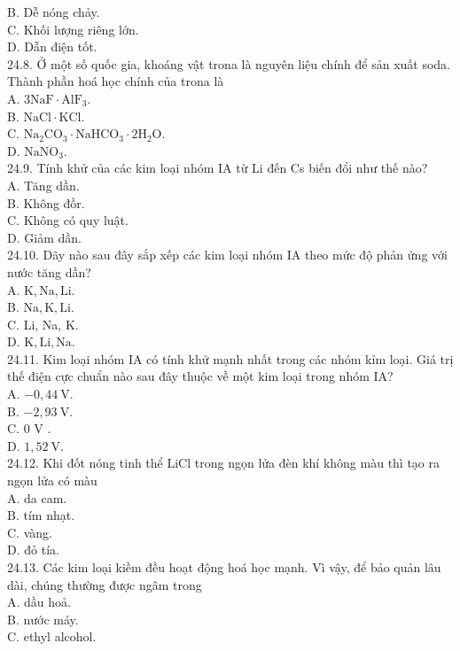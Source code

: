 \documentclass[10pt]{article}
\begin{document}
B. Dễ nóng chảy.\\
C. Khối lượng riêng lớn.\\
D. Dẫn điện tốt.\\
24.8. Ở một số quốc gia, khoáng vật trona là nguyên liệu chính để sản xuất soda. Thành phần hoá học chính của trona là\\
A. $3 \mathrm{NaF} \cdot \mathrm{AlF}_{3}$.\\
B. $\mathrm{NaCl} \cdot \mathrm{KCl}$.\\
C. $\mathrm{Na}_{2} \mathrm{CO}_{3} \cdot \mathrm{NaHCO}_{3} \cdot 2 \mathrm{H}_{2} \mathrm{O}$.\\
D. $\mathrm{NaNO}_{3}$.\\
24.9. Tính khử của các kim loại nhóm IA từ Li đến Cs biến đổi như thế nào?\\
A. Tăng dần.\\
B. Không đồr.\\
C. Không có quy luật.\\
D. Giảm dần.\\
24.10. Dãy nào sau đây sắp xếp các kim loại nhóm IA theo mức độ phản ứng với nước tăng dần?\\
A. $\mathrm{K}, \mathrm{Na}, \mathrm{Li}$.\\
B. $\mathrm{Na}, \mathrm{K}, \mathrm{Li}$.\\
C. Li, Na, K.\\
D. $\mathrm{K}, \mathrm{Li}, \mathrm{Na}$.\\
24.11. Kim loại nhóm IA có tính khử mạnh nhất trong các nhóm kỉm loại. Giá trị thế điện cực chuẩn nào sau đây thuộc về một kim loại trong nhóm IA?\\
A. $-0,44 \mathrm{~V}$.\\
B. $-2,93 \mathrm{~V}$.\\
C. 0 V .\\
D. $1,52 \mathrm{~V}$.\\
24.12. Khi đốt nóng tinh thể LiCl trong ngọn lửa đèn khí không màu thì tạo ra ngọn lửa có màu\\
A. da cam.\\
B. tím nhạt.\\
C. vàng.\\
D. đỏ tía.\\
24.13. Các kim loại kiềm đều hoạt động hoá học mạnh. Vì vậy, để bảo quản lâu dài, chúng thường được ngâm trong\\
A. dầu hoả.\\
B. nước máy.\\
C. ethyl alcohol.\\
\end{document}
